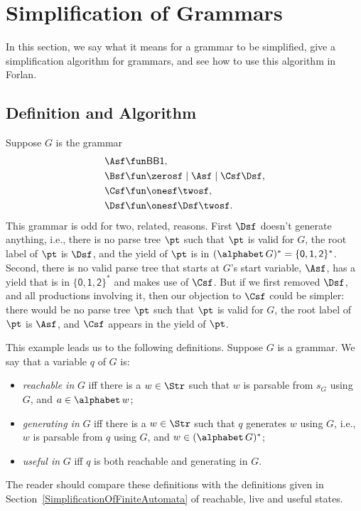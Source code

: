 \section{Simplification of Grammars}
\label{SimplificationOfGrammars}

In this section, we say what it means for a grammar to be simplified,
give a simplification algorithm for grammars, and see how to use this
algorithm in Forlan.

\subsection{Definition and Algorithm}

Suppose $G$ is the grammar
\begin{align*}
\Asf &\fun \mathsf{BB1}, \\
\Bsf &\fun \zerosf\mid\Asf\mid\Csf\Dsf, \\
\Csf &\fun \onesf\twosf , \\
\Dsf &\fun \onesf\Dsf\twosf .
\end{align*}
This grammar is odd for two, related, reasons.  First
$\Dsf$ doesn't generate anything, i.e., there is no parse
tree $\pt$ such that $\pt$ is valid for $G$, the root label of
$\pt$ is $\Dsf$, and the yield of $\pt$ is in $(\alphabet\,G)^* =
\{\mathsf{0,1,2}\}^*$.
Second, there is no valid parse tree that starts at $G$'s
start variable, $\Asf$, has a yield that is in $\{\mathsf{0,1,2}\}^*$
and makes use of $\Csf$.  But if we first removed $\Dsf$, and all productions
involving it, then our objection to $\Csf$ could be simpler: there
would be no parse tree $\pt$ such that $\pt$ is valid for $G$,
the root label of $\pt$ is $\Asf$, and $\Csf$ appears in the yield
of $\pt$.

This example leads us to the following definitions.  Suppose $G$ is a
grammar.  We say that a variable $q$ of $G$ is:
\begin{itemize}
\item \emph{reachable in} $G$ iff there is a $w\in\Str$ such that
  $w$ is parsable from $s_G$ using $G$, and $a\in\alphabet\,w$;

\item \emph{generating in} $G$ iff there is a $w\in\Str$ such that $q$
  generates $w$ using $G$, i.e., $w$ is parsable from $q$ using $G$,
  and $w\in(\alphabet\,G)^*$;

\item \emph{useful in} $G$ iff $q$ is both reachable and
  generating in $G$.
\end{itemize}
The reader should compare these definitions with the definitions given
in Section~\ref{SimplificationOfFiniteAutomata} of reachable, live and
useful states.

